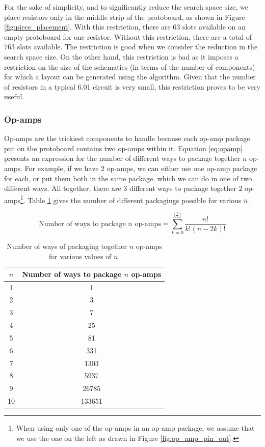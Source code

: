 For the sake of simplicity, and to significantly reduce the search space size, we
place resistors only in the middle strip of the protoboard, as shown in Figure
\ref{fig:piece_placement}.
With this restriction, there are $63$ slots available on an empty protoboard for
one resistor. Without
this restriction, there are a total of $763$ slots available. The restriction is
good when we consider the reduction in the search space size. On the other hand,
this restriction is bad as it imposes a restriction on the size of the
schematics (in terms of the number of components) for which a layout can be
generated using the algorithm.
Given that the number
of resistors in a typical 6.01 circuit is very
small, this restriction proves to be very useful.

\subsubsection{Op-amps}

Op-amps are the trickiest components to handle because each op-amp package put
on the protoboard contains two op-amps within it. Equation
\ref{eq:opamp} presents an expression for the number of
different ways to package together $n$ op-amps. For example, if we have $2$
op-amps, we can either use one op-amp package for each, or put them both in the
same package, which we can do in one of two different ways. All together, there
are $3$ different ways to package together $2$ op-amps\footnote{When using only
one of the op-amps in an op-amp package, we assume that we use the one on the
left as drawn in Figure \ref{fig:op_amp_pin_out}.}.
Table \ref{tb:opamp} gives the number of different packagings possible for
various $n$.

\begin{equation}
\text{Number of ways to package $n$ op-amps} =
\sum\limits_{k=0}^{\lfloor\frac{n}{2}\rfloor}{\frac{n!}{k!(n - 2k)!}}
\label{eq:opamp}
\end{equation}

\begin{table}
\begin{center}
\begin{singlespace}
\begin{tabular}{c | c}
$n$ & Number of ways to package $n$ op-amps \\
\hline
\hline
1 & 1 \\
2 & 3 \\
3 & 7 \\
4 & 25 \\
5 & 81 \\
6 & 331 \\
7 & 1303 \\
8 & 5937 \\
9 & 26785 \\
10 & 133651
\end{tabular}
\end{singlespace}
\end{center}
\caption[Op-amp packaging possibilities]{Number of ways of packaging together
$n$ op-amps for various values of $n$.}
\label{tb:opamp}
\end{table}

